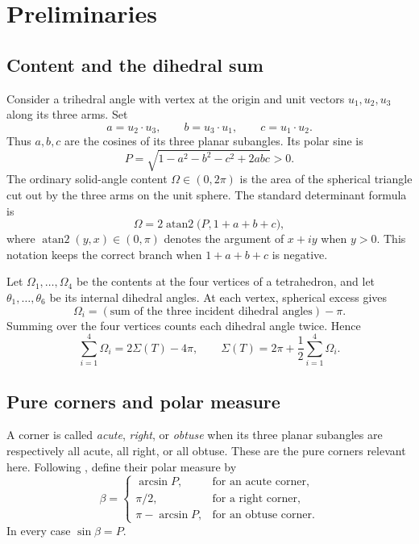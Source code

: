 \documentclass[11pt,a4paper]{article}
\theoremstyle{definition}
\theoremstyle{remark}
\newcommand{\atanTwo}{\operatorname{atan2}}
\begin{document}
\section{Preliminaries}\label{sec:preliminaries}

\subsection{Content and the dihedral sum}

Consider a trihedral angle with vertex at the origin and unit vectors
$u_1,u_2,u_3$ along its three arms.  Set
\[
 a=u_2\mathbin{\cdot}u_3,\qquad
 b=u_3\mathbin{\cdot}u_1,\qquad
 c=u_1\mathbin{\cdot}u_2.
\]
Thus $a,b,c$ are the cosines of its three planar subangles.  Its polar sine is
\begin{equation}\label{eq:polar-sine}
 P=\sqrt{1-a^2-b^2-c^2+2abc}>0.
\end{equation}
The ordinary solid-angle content $\Omega\in(0,2\pi)$ is the area of the
spherical triangle cut out by the three arms on the unit sphere.  The standard
determinant formula is
\begin{equation}\label{eq:content-formula}
 \Omega=2\atanTwo\bigl(P,1+a+b+c\bigr),
\end{equation}
where $\atanTwo(y,x)\in(0,\pi)$ denotes the argument of $x+iy$ when $y>0$.
This notation keeps the correct branch when $1+a+b+c$ is negative.

Let $\Omega_1,\ldots,\Omega_4$ be the contents at the four vertices of a
tetrahedron, and let $\theta_1,\ldots,\theta_6$ be its internal dihedral
angles.  At each vertex, spherical excess gives
\[
 \Omega_i=(\text{sum of the three incident dihedral angles})-\pi.
\]
Summing over the four vertices counts each dihedral angle twice.  Hence
\begin{equation}\label{eq:content-dihedral}
 \sum_{i=1}^4\Omega_i=2\Sigma(T)-4\pi,
 \qquad
 \Sigma(T)=2\pi+\frac12\sum_{i=1}^4\Omega_i.
\end{equation}

\subsection{Pure corners and polar measure}

A corner is called \emph{acute}, \emph{right}, or \emph{obtuse} when its
three planar subangles are respectively all acute, all right, or all obtuse.
These are the pure corners relevant here.  Following
\cite{HajjaHammoudeh2014}, define their polar measure by
\begin{equation}\label{eq:polar-measure}
 \beta=
 \begin{cases}
  \arcsin P, & \text{for an acute corner},\\[1mm]
  \pi/2, & \text{for a right corner},\\[1mm]
  \pi-\arcsin P, & \text{for an obtuse corner}.
 \end{cases}
\end{equation}
In every case $\sin\beta=P$.
\end{document}
